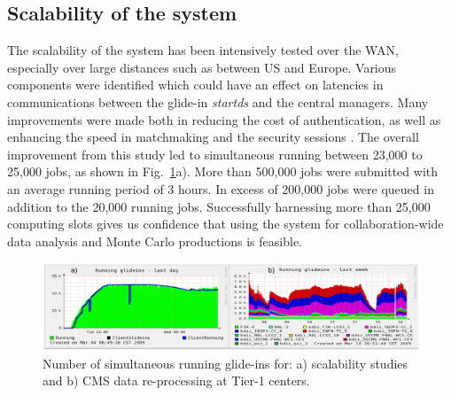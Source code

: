 \documentclass[a4paper]{jpconf}
\begin{document}
\subsection {Scalability of the system}
The scalability of the system has been intensively tested over the WAN, especially over large distances such 
as between US and Europe. Various components were identified which could have an effect on
latencies in communications between the glide-in \emph{startds} and the central managers. Many improvements were
made both in reducing the cost of authentication, as well as enhancing the speed in matchmaking and 
the security sessions \cite{bib:scalability}. The overall improvement 
from this study led to simultaneous running between 23,000 to 25,000 jobs, as shown in Fig.~\ref{fig:glideinT1stat}a).
More than 500,000 jobs were submitted with an average running period of 3 hours. In excess of  200,000 jobs were queued in addition to the
20,000 running jobs. Successfully harnessing more than 25,000 computing slots gives us confidence that using the system for collaboration-wide 
data analysis and Monte Carlo productions is feasible.
\begin{figure}
\begin{center}
\includegraphics[scale=0.55]{glideinT1stat}
\end{center}
\caption{Number of simultaneous running glide-ins for: a) scalability studies and b) CMS data re-processing at Tier-1 centers.}
\label{fig:glideinT1stat}
\end{figure}
\end{document}
